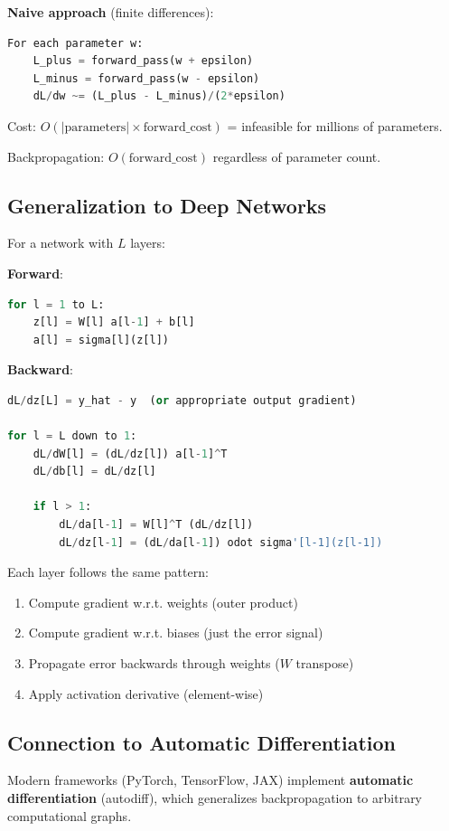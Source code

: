 \textbf{Naive approach} (finite differences):
\begin{lstlisting}[language=Python]
For each parameter w:
    L_plus = forward_pass(w + epsilon)
    L_minus = forward_pass(w - epsilon)
    dL/dw ~= (L_plus - L_minus)/(2*epsilon)
\end{lstlisting}

Cost: $O(|\text{parameters}| \times \text{forward\_cost})$ = infeasible for millions of parameters.

Backpropagation: $O(\text{forward\_cost})$ regardless of parameter count.

\subsection{Generalization to Deep Networks}

For a network with $L$ layers:

\textbf{Forward}:
\begin{lstlisting}[language=Python]
for l = 1 to L:
    z[l] = W[l] a[l-1] + b[l]
    a[l] = sigma[l](z[l])
\end{lstlisting}

\textbf{Backward}:
\begin{lstlisting}[language=Python]
dL/dz[L] = y_hat - y  (or appropriate output gradient)

for l = L down to 1:
    dL/dW[l] = (dL/dz[l]) a[l-1]^T
    dL/db[l] = dL/dz[l]

    if l > 1:
        dL/da[l-1] = W[l]^T (dL/dz[l])
        dL/dz[l-1] = (dL/da[l-1]) odot sigma'[l-1](z[l-1])
\end{lstlisting}

Each layer follows the same pattern:
\begin{enumerate}
\item Compute gradient w.r.t. weights (outer product)
\item Compute gradient w.r.t. biases (just the error signal)
\item Propagate error backwards through weights ($W$ transpose)
\item Apply activation derivative (element-wise)
\end{enumerate}

\subsection{Connection to Automatic Differentiation}

Modern frameworks (PyTorch, TensorFlow, JAX) implement \textbf{automatic differentiation} (autodiff), which generalizes backpropagation to arbitrary computational graphs.

